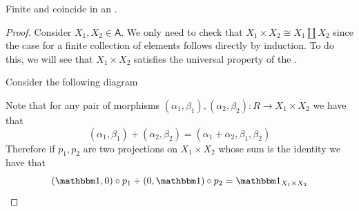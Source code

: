 \documentclass[../../main]{subfiles}
\begin{document}
\begin{lemma} \label{lemma:products-coproducts-additive}
  Finite  and  coincide in an .
\end{lemma}
\begin{proof}
  Consider \(X_{1}, X_{2} \in \mathsf{A}\). We only need to check that \(X_{1} \times X_{2} \cong X_{1} \amalg X_{2}\) since the case for a finite collection of elements follows directly by induction.
  To do this, we will see that \(X_{1} \times X_{2}\) satisfies the universal property of the .

  Consider the following diagram
  \begin{center}
  \end{center}

  Note that for any pair of morphisms \((\alpha_{1}, \beta_{1}), (\alpha_{2}, \beta_{2}): R \to X_{1} \times X_{2}\) we have that
  \begin{equation*}
    (\alpha_{1}, \beta_{1}) + (\alpha_{2}, \beta_{2}) = (\alpha_{1} + \alpha_{2}, \beta_{1}, \beta_{2})
  \end{equation*}
  Therefore if \(p_{1}, p_{2}\) are two projections on \(X_{1} \times X_{2}\) whose sum is the identity we have that
  \begin{equation*}
    (\id, 0) \circ p_{1} + (0, \id) \circ p_{2} = \id_{X_{1} \times X_{2}}
  \end{equation*}


\end{proof}
\end{document}
